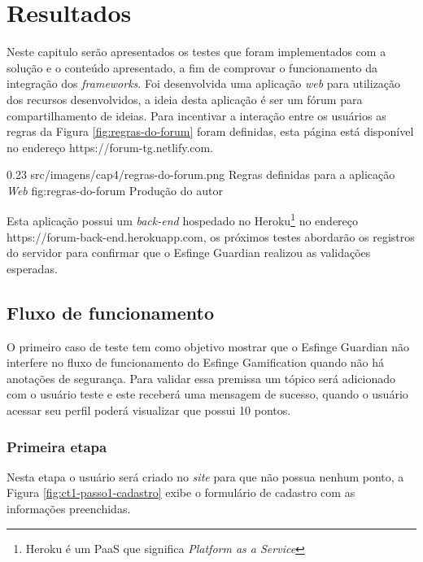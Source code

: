 \newpage
\chapter{Resultados}
Neste capitulo serão apresentados os testes que foram implementados com a solução e o conteúdo apresentado, a fim de comprovar o funcionamento da integração dos \textit{frameworks}. Foi desenvolvida uma aplicação \textit{web} para utilização dos recursos desenvolvidos, a ideia desta aplicação é ser um fórum para compartilhamento de ideias. Para incentivar a interação entre os usuários as regras da Figura \ref{fig:regras-do-forum} foram definidas, esta página está disponível no endereço https://forum-tg.netlify.com.

\begin{image}
{0.23}
{src/imagens/cap4/regras-do-forum.png}
{Regras definidas para a aplicação \textit{Web}}
{fig:regras-do-forum}
{Produção do autor}
\end{image}

\par Esta aplicação possui um \textit{back-end} hospedado no Heroku\footnote{Heroku é um PaaS que significa \textit{Platform as a Service}} no endereço https://forum-back-end.herokuapp.com, os próximos testes abordarão os registros do servidor para confirmar que o Esfinge Guardian realizou as validações esperadas.

\section{Fluxo de funcionamento}

\par O primeiro caso de teste tem como objetivo mostrar que o Esfinge Guardian não interfere no fluxo de funcionamento do Esfinge Gamification quando não há anotações de segurança. Para validar essa premissa um tópico será adicionado com o usuário teste e este receberá uma mensagem de sucesso, quando o usuário acessar seu perfil poderá visualizar que possui 10 pontos.

\subsection{Primeira etapa}

\par Nesta etapa o usuário será criado no \textit{site} para que não possua nenhum ponto, a Figura \ref{fig:ct1-passo1-cadastro} exibe o formulário de cadastro com as informações preenchidas.

